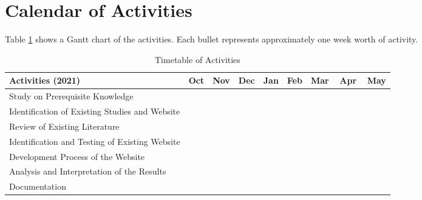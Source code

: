 \newpage
\section{Calendar of Activities}

Table \ref{tab:timetableactivities} shows a Gantt chart of the activities.  Each bullet represents approximately
one week worth of activity.

%
%
\newcommand{\weekone}{\textbullet}
\newcommand{\weektwo}{\textbullet \textbullet}
\newcommand{\weekthree}{\textbullet \textbullet \textbullet}
\newcommand{\weekfour}{\textbullet \textbullet \textbullet \textbullet}

%
%
\begin{comment}
   \newcommand{\weekone}{$\star$}
   \newcommand{\weektwo}{$\star \star$}
   \newcommand{\weekthree}{$\star \star \star$}
   \newcommand{\weekfour}{$\star \star \star \star$ }
\end{comment}


\begin{table}[h!]   %
\centering
\caption{Timetable of Activities} \vspace{0.25em}
\begin{tabular}{|p{2in}|c|c|c|c|c|c|c|c|} \hline
\centering 
Activities (2021) & Oct   & Nov & Dec & Jan & Feb & Mar & Apr & May \\ \hline
Study on Prerequisite Knowledge      & \weekthree~~ &   &  &  &  &  & &   \\ \hline
Identification of Existing Studies and Website  & \weekthree~~  & \weekfour & \weekthree~~ &  &  &  & &  \\ \hline
Review of Existing Literature      &   & \weekfour &  \weekthree~~ &  &  &  &  & \\ \hline
Identification and Testing of Existing Website     &   &  &   & \weektwo~~~ & \weekfour & \weekthree~~ &  &  \\ \hline
Development Process of the Website      &   &  &   &  & \weekthree~~ & \weektwo~~ & \weekone~~~~~ &  \\ \hline
Analysis and Interpretation of the Results &   &  &  &  &  & \weekfour & \weekfour & \weektwo~~~ \\ \hline
Documentation & \weekfour  & \weekfour & \weekfour & \weekfour & \weekfour & \weekfour &\weekfour  &\weekfour  \\ \hline
\end{tabular}
\label{tab:timetableactivities}
\end{table}


